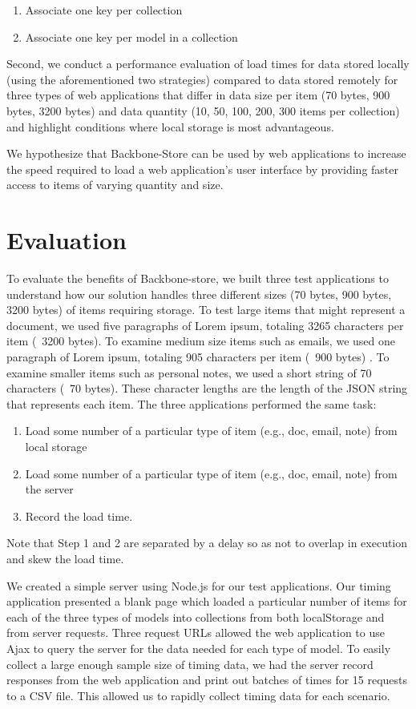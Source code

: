 \documentclass[12pt]{article}
\begin{document}
\begin{enumerate}
\item Associate one key per collection
\item Associate one key per model in a collection
\end{enumerate}

Second, we conduct a performance evaluation of load times for data
stored locally (using the aforementioned two strategies) compared to data
stored remotely for three types of web applications that differ in data size
per item (70 bytes, 900 bytes, 3200 bytes) and data quantity (10, 50, 100, 200,
300 items per collection) and highlight conditions where local storage is most
advantageous.

We hypothesize that Backbone-Store can be used by web applications to increase the speed required to load a web application's user interface by providing faster access to items of varying quantity and size.

\section{Evaluation}

To evaluate the benefits of Backbone-store, we built three test applications to
understand how our solution handles three different sizes (70 bytes, 900 bytes, 3200 bytes) of items requiring
storage. To test large items that might represent a document, we used five
paragraphs of Lorem ipsum, totaling 3265 characters per item (~3200 bytes). To examine
medium size items such as emails, we used one paragraph of Lorem ipsum,
totaling 905 characters per item (~900 bytes) . To examine smaller items such as personal
notes, we used a short string of 70 characters (~70 bytes). These character lengths are the
length of the JSON string that represents each item. The three applications
performed the same task: 
\begin{enumerate}
\item Load some number of a particular type of item (e.g., doc, email, note) from
local storage
\item Load some number of a particular type of item (e.g., doc, email, note) from the server
\item Record the load time.
\end{enumerate}

Note that Step 1 and 2 are separated by a delay so as not to overlap in
execution and skew the load time.

We created a simple server using Node.js \cite{node} for our test applications. Our timing
application presented a blank page which loaded a particular number of items
for each of the three types of models into collections from both localStorage
and from server requests. Three request URLs allowed the web application to use
Ajax to query the server for the data needed for each type of model. To easily
collect a large enough sample size of timing data, we had the server record
responses from the web application and print out batches of times for 15
requests to a CSV file. This allowed us to rapidly collect timing data for each
scenario.
\end{document}

